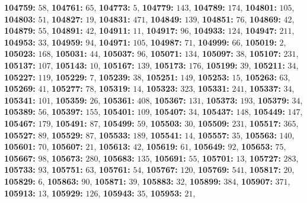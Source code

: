 \textsf{\bfseries 104759:} $58$, \textsf{\bfseries 104761:} $65$, \textsf{\bfseries 104773:} $5$, \textsf{\bfseries 104779:} $143$, \textsf{\bfseries 104789:} $174$, \textsf{\bfseries 104801:} $105$, \textsf{\bfseries 104803:} $51$, \textsf{\bfseries 104827:} $19$, \textsf{\bfseries 104831:} $471$, \textsf{\bfseries 104849:} $139$, \textsf{\bfseries 104851:} $76$, \textsf{\bfseries 104869:} $42$, \textsf{\bfseries 104879:} $55$, \textsf{\bfseries 104891:} $42$, \textsf{\bfseries 104911:} $11$, \textsf{\bfseries 104917:} $96$, \textsf{\bfseries 104933:} $124$, \textsf{\bfseries 104947:} $211$, \textsf{\bfseries 104953:} $33$, \textsf{\bfseries 104959:} $94$, \textsf{\bfseries 104971:} $105$, \textsf{\bfseries 104987:} $71$, \textsf{\bfseries 104999:} $66$, \textsf{\bfseries 105019:} $2$, \textsf{\bfseries 105023:} $168$, \textsf{\bfseries 105031:} $44$, \textsf{\bfseries 105037:} $96$, \textsf{\bfseries 105071:} $134$, \textsf{\bfseries 105097:} $38$, \textsf{\bfseries 105107:} $231$, \textsf{\bfseries 105137:} $107$, \textsf{\bfseries 105143:} $10$, \textsf{\bfseries 105167:} $139$, \textsf{\bfseries 105173:} $176$, \textsf{\bfseries 105199:} $39$, \textsf{\bfseries 105211:} $34$, \textsf{\bfseries 105227:} $119$, \textsf{\bfseries 105229:} $7$, \textsf{\bfseries 105239:} $38$, \textsf{\bfseries 105251:} $149$, \textsf{\bfseries 105253:} $15$, \textsf{\bfseries 105263:} $63$, \textsf{\bfseries 105269:} $41$, \textsf{\bfseries 105277:} $78$, \textsf{\bfseries 105319:} $14$, \textsf{\bfseries 105323:} $323$, \textsf{\bfseries 105331:} $241$, \textsf{\bfseries 105337:} $34$, \textsf{\bfseries 105341:} $101$, \textsf{\bfseries 105359:} $26$, \textsf{\bfseries 105361:} $408$, \textsf{\bfseries 105367:} $131$, \textsf{\bfseries 105373:} $193$, \textsf{\bfseries 105379:} $34$, \textsf{\bfseries 105389:} $56$, \textsf{\bfseries 105397:} $155$, \textsf{\bfseries 105401:} $109$, \textsf{\bfseries 105407:} $34$, \textsf{\bfseries 105437:} $148$, \textsf{\bfseries 105449:} $147$, \textsf{\bfseries 105467:} $179$, \textsf{\bfseries 105491:} $87$, \textsf{\bfseries 105499:} $59$, \textsf{\bfseries 105503:} $30$, \textsf{\bfseries 105509:} $231$, \textsf{\bfseries 105517:} $365$, \textsf{\bfseries 105527:} $89$, \textsf{\bfseries 105529:} $87$, \textsf{\bfseries 105533:} $189$, \textsf{\bfseries 105541:} $14$, \textsf{\bfseries 105557:} $35$, \textsf{\bfseries 105563:} $140$, \textsf{\bfseries 105601:} $70$, \textsf{\bfseries 105607:} $21$, \textsf{\bfseries 105613:} $42$, \textsf{\bfseries 105619:} $61$, \textsf{\bfseries 105649:} $92$, \textsf{\bfseries 105653:} $75$, \textsf{\bfseries 105667:} $98$, \textsf{\bfseries 105673:} $280$, \textsf{\bfseries 105683:} $135$, \textsf{\bfseries 105691:} $55$, \textsf{\bfseries 105701:} $13$, \textsf{\bfseries 105727:} $283$, \textsf{\bfseries 105733:} $93$, \textsf{\bfseries 105751:} $63$, \textsf{\bfseries 105761:} $54$, \textsf{\bfseries 105767:} $120$, \textsf{\bfseries 105769:} $541$, \textsf{\bfseries 105817:} $20$, \textsf{\bfseries 105829:} $6$, \textsf{\bfseries 105863:} $90$, \textsf{\bfseries 105871:} $39$, \textsf{\bfseries 105883:} $32$, \textsf{\bfseries 105899:} $384$, \textsf{\bfseries 105907:} $371$, \textsf{\bfseries 105913:} $13$, \textsf{\bfseries 105929:} $126$, \textsf{\bfseries 105943:} $35$, \textsf{\bfseries 105953:} $21$, 
